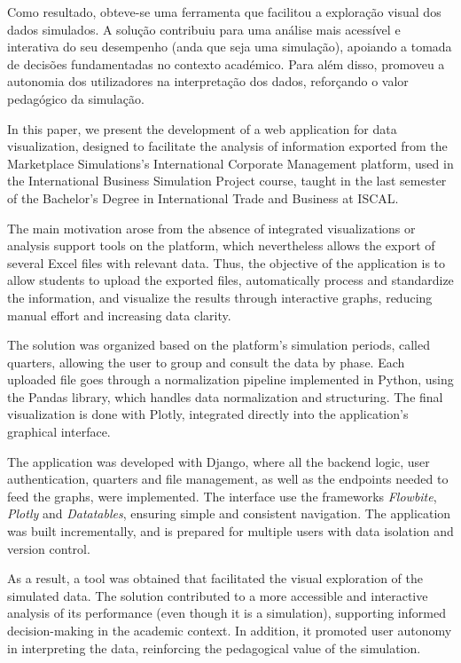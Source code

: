Como resultado, obteve-se uma ferramenta que facilitou a exploração visual dos dados simulados. A solução contribuiu para uma análise mais acessível e interativa do seu desempenho (anda que seja uma simulação), apoiando a tomada de decisões fundamentadas no contexto académico. Para além disso, promoveu a autonomia dos utilizadores na interpretação dos dados, reforçando o valor pedagógico da simulação.


In this paper, we present the development of a web application for data visualization, designed to facilitate the analysis of information exported from the Marketplace Simulations's International Corporate Management platform, used in the International Business Simulation Project course, taught in the last semester of the Bachelor's Degree in International Trade and Business at ISCAL.

The main motivation arose from the absence of integrated visualizations or analysis support tools on the platform, which nevertheless allows the export of several Excel files with relevant data. Thus, the objective of the application is to allow students to upload the exported files, automatically process and standardize the information, and visualize the results through interactive graphs, reducing manual effort and increasing data clarity.

The solution was organized based on the platform's simulation periods, called quarters, allowing the user to group and consult the data by phase. Each uploaded file goes through a normalization pipeline implemented in Python, using the Pandas library, which handles data normalization and structuring. The final visualization is done with Plotly, integrated directly into the application's graphical interface.

The application was developed with Django, where all the backend logic, user authentication, quarters and file management, as well as the endpoints needed to feed the graphs, were implemented. The interface use the frameworks \textit{Flowbite}, \textit{Plotly} and \textit{Datatables}, ensuring simple and consistent navigation. The application was built incrementally, and is prepared for multiple users with data isolation and version control.

As a result, a tool was obtained that facilitated the visual exploration of the simulated data. The solution contributed to a more accessible and interactive analysis of its performance (even though it is a simulation), supporting informed decision-making in the academic context. In addition, it promoted user autonomy in interpreting the data, reinforcing the pedagogical value of the simulation.
